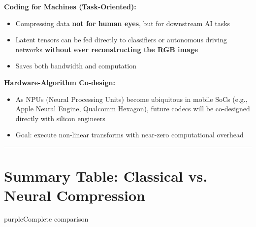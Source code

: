 \textbf{Coding for Machines (Task-Oriented):}
\begin{itemize}
\item Compressing data \textbf{not for human eyes}, but for downstream AI tasks
\item Latent tensors can be fed directly to classifiers or autonomous driving networks \textbf{without ever reconstructing the RGB image}
\item Saves both bandwidth and computation
\end{itemize}

\textbf{Hardware-Algorithm Co-design:}
\begin{itemize}
\item As NPUs (Neural Processing Units) become ubiquitous in mobile SoCs (e.g., Apple Neural Engine, Qualcomm Hexagon), future codecs will be co-designed directly with silicon engineers
\item Goal: execute non-linear transforms with near-zero computational overhead
\end{itemize}

\bigskip\hrule\bigskip

\section{Summary Table: Classical vs. Neural Compression}

\begin{calloutbox}{purple}{Complete comparison}

\end{calloutbox}

